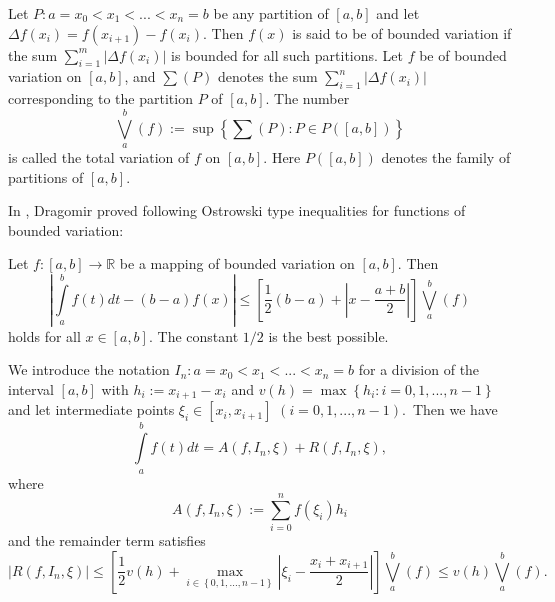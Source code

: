 \documentclass[
11pt,%
tightenlines,%
twoside,%
onecolumn,%
nofloats,%
nobibnotes,%
nofootinbib,%
superscriptaddress,%
noshowpacs,%
centertags]%
{revtex4}
\begin{document}
\begin{definition}
Let $P:a=x_{0}<x_{1}<...<x_{n}=b$ be any partition of $\left[
a,b\right] $ and let $\Delta f(x_{i})=f(x_{i+1})-f(x_{i}).$ Then
$f(x)$ is said to be of bounded variation if the sum $
\sum\limits_{i=1}^{m}\left\vert \Delta f(x_{i})\right\vert $ is
bounded for all such partitions. Let $f$ be of bounded variation on
$\left[ a,b\right] $, and $\sum \left( P\right) $ denotes the sum
$\sum\limits_{i=1}^{n}\left\vert \Delta
f(x_{i})\right\vert $ corresponding to the partition $P$ of $\left[ a,b%
\right] $. The number%
\begin{equation*}
\bigvee\limits_{a}^{b}\left( f\right) :=\sup \left\{ \sum \left(
P\right) :P\in \mathit{P}(\left[ a,b\right] )\right\}
\end{equation*}%
is called the total variation of $f$ on $\left[ a,b\right] .$ Here $\mathit{P%
}(\left[ a,b\right] )$ denotes the family of partitions of $\left[ a,b\right]
.$
\end{definition}

In \cite{dragomir3}, Dragomir proved following Ostrowski type inequalities
for functions of bounded variation:

\begin{theorem}
Let $f:\left[ a,b\right] \rightarrow
\mathbb{R}
$ be a mapping of bounded variation on $\left[ a,b\right] .$ Then%
\begin{equation}
\left\vert \int\limits_{a}^{b}f(t)dt-\left( b-a\right) f(x)\right\vert \leq
\left[ \frac{1}{2}\left( b-a\right) +\left\vert x-\frac{a+b}{2}\right\vert %
\right] \bigvee\limits_{a}^{b}(f)  \label{E10}
\end{equation}%
holds for all $x\in \left[ a,b\right] .$ The constant $1/2$ is the
best possible.
\end{theorem}

We introduce the notation $I_{n}:a=x_{0}<x_{1}<...<x_{n}=b$ for a division
of the interval $\left[ a,b\right] $ with $h_{i}:=x_{i+1}-x_{i}$ and $%
v(h)=\max \left\{ h_{i}:i=0,1,...,n-1\right\} $ and let intermediate points $%
\xi _{i}\in \left[ x_{i},x_{i+1}\right] $ $\left( i=0,1,...,n-1\right) $.\
Then we have%
\begin{equation}
\int\limits_{a}^{b}f(t)dt=A(f,I_{n},\xi )+R(f,I_{n},\xi ),
\label{2}
\end{equation}%
where
\begin{equation}
A(f,I_{n},\xi ):=\sum\limits_{i=0}^{n}f(\xi _{i})h_{i}  \label{3}
\end{equation}%
and  the remainder term satisfies%
\begin{equation}\label{4}
\left\vert R(f,I_{n},\xi )\right\vert \leq \left[ \frac{1}{2}%
v(h)+\max_{i\in \left\{ 0,1,...,n-1\right\} }\left\vert \xi
_{i}-\frac{x_{i}+x_{i+1}}{2}\right\vert \right]
\bigvee\limits_{a}^{b}(f)  \leq v(h)\bigvee\limits_{a}^{b}(f).
\end{equation}
\end{document}
